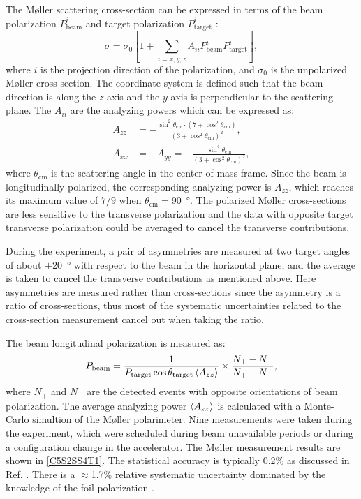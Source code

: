 The M{\o}ller scattering cross-section can be expressed in terms of the beam polarization $P_{\mathrm{beam}}^i$ and target polarization $P_{\mathrm{target}}^i$ \cite{Alcorn2004}:
\begin{equation} \label{C5S2SS4E1}
\sigma = \sigma_0\left[1+\sum_{i=x,y,z}A_{ii}P_{\mathrm{beam}}^iP_{\mathrm{target}}^i\right],
\end{equation}
where $i$ is the projection direction of the polarization, and $\sigma_0$ is the unpolarized M{\o}ller cross-section. The coordinate system is defined such that the beam direction is along the $z$-axis and the $y$-axis is perpendicular to the scattering plane. The $A_{ii}$ are the analyzing powers which can be expressed as:
\begin{align} \label{C5S2SS4E2}
A_{zz} & = -\frac{\sin^2\theta_{\mathrm{cm}}\cdot(7+\cos^2\theta_{\mathrm{cm}})}{(3+\cos^2\theta_{\mathrm{cm}})^2}, \\ \label{C5S2SS4E3}
A_{xx} & = -A_{yy} =  -\frac{\sin^4\theta_{\mathrm{cm}}}{(3+\cos^2\theta_{\mathrm{cm}})^2},
\end{align}
where $\theta_{\mathrm{cm}}$ is the scattering angle in the center-of-mass frame. Since the beam is longitudinally polarized, the corresponding analyzing power is $A_{zz}$, which reaches its maximum value of $7/9$ when $\theta_{\mathrm{cm}}=$\SI{90}{\degree}. The polarized M{\o}ller cross-sections are less sensitive to the transverse polarization and the data with opposite target transverse polarization could be averaged to cancel the transverse contributions.

During the experiment, a pair of asymmetries are measured at two target angles of about $\pm$\SI{20}{\degree} with respect to the beam in the horizontal plane, and the average is taken to cancel the transverse contributions as mentioned above. Here asymmetries are measured rather than cross-sections since the asymmetry is a ratio of cross-sections, thus most of the systematic uncertainties related to the cross-section measurement cancel out when taking the ratio.

The beam longitudinal polarization is measured as:
\begin{equation} \label{C5S2SS4E4}
P_{\mathrm{beam}} = \frac{1}{P_{\mathrm{target}}\cos\theta_{\mathrm{target}}\expval{A_{zz}}}\times\frac{N_+-N_-}{N_+-N_-},
\end{equation}
where $N_+$ and $N_-$ are the detected events with opposite orientations of beam polarization. The average analyzing power $\expval{A_{zz}}$ is  calculated with a Monte-Carlo simultion of the M{\o}ller polarimeter. Nine measurements were taken during the experiment, which were scheduled during beam unavailable periods or during a configuration change in the accelerator. The M{\o}ller measurement results are shown in \cref{C5S2SS4T1}. The statistical accuracy is typically 0.2\% as discussed in Ref. \cite{Alcorn2004}. There is a $\approx$1.7\% relative systematic uncertainty dominated by the knowledge of the foil polarization \cite{MOLLER}.

